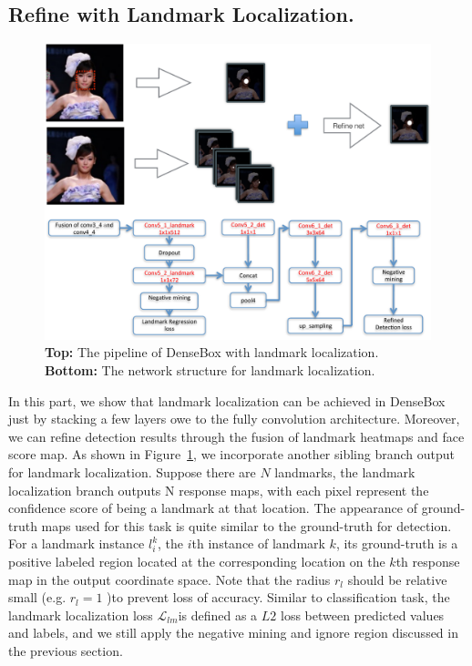\subsection{Refine with Landmark Localization.} 
	\begin{figure}[!hbtp]
	\centering
	 \includegraphics[scale=0.45]{figures/figure4-crop.pdf}
	\caption{\textbf{Top: } The pipeline of DenseBox with landmark localization. \textbf{Bottom: } The network structure for landmark localization. }
	\label{fig:fig_refine}
	\end{figure}
In this part, we show that landmark localization can be achieved in DenseBox just by stacking a few layers owe to the fully convolution architecture. Moreover, we can refine detection results through the fusion of landmark heatmaps and face score map. As shown in Figure~\ref{fig:fig_refine},  we incorporate another sibling branch output for landmark localization. Suppose there are $N$ landmarks, the landmark localization branch outputs N response maps, with each pixel represent the confidence score of being a landmark at that location.  The appearance of ground-truth maps used for this task is quite similar to the ground-truth for detection.  For a landmark instance $l^k_i$, the $i$th instance of landmark $k$, its ground-truth is a positive labeled region located at the corresponding location on the $k$th response map in the output coordinate space.  Note that the radius $r_l$ should be relative small (e.g. $r_l = 1$  )to prevent loss of accuracy.   Similar to classification task, the landmark localization loss $\mathcal{L} _{lm}$is defined as a $L2$ loss between predicted values and labels, and we still apply the negative mining and ignore region discussed in the previous section. 

